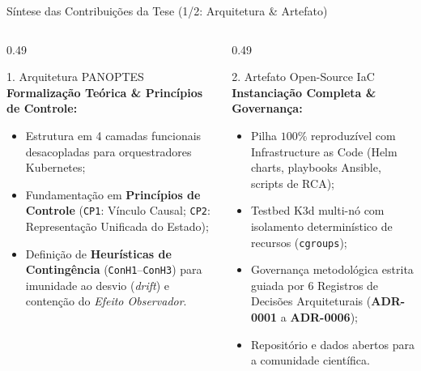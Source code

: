 \documentclass[aspectratio=169, 10pt]{beamer}
\begin{document}
\begin{frame}{Síntese das Contribuições da Tese (1/2: Arquitetura \& Artefato)}
  \begin{columns}[T]
    \begin{column}{0.49\textwidth}
      \begin{block}{\large 1. Arquitetura PANOPTES}
        \small
        \textbf{Formalização Teórica \& Princípios de Controle:}
        \begin{itemize}
          \item Estrutura em 4 camadas funcionais desacopladas para orquestradores Kubernetes;
          \item Fundamentação em \textbf{Princípios de Controle} (\texttt{CP1}: Vínculo Causal; \texttt{CP2}: Representação Unificada do Estado);
          \item Definição de \textbf{Heurísticas de Contingência} (\texttt{ConH1}--\texttt{ConH3}) para imunidade ao desvio (\textit{drift}) e contenção do \textit{Efeito Observador}.
        \end{itemize}
      \end{block}
    \end{column}
    
    \begin{column}{0.49\textwidth}
      \begin{block}{\large 2. Artefato Open-Source IaC}
        \small
        \textbf{Instanciação Completa \& Governança:}
        \begin{itemize}
          \item Pilha $100\%$ reproduzível com Infrastructure as Code (Helm charts, playbooks Ansible, scripts de RCA);
          \item Testbed K3d multi-nó com isolamento determinístico de recursos (\texttt{cgroups});
          \item Governança metodológica estrita guiada por 6 Registros de Decisões Arquiteturais (\textbf{ADR-0001} a \textbf{ADR-0006});
          \item Repositório e dados abertos para a comunidade científica.
        \end{itemize}
      \end{block}
    \end{column}
  \end{columns}
\end{frame}
\end{document}
